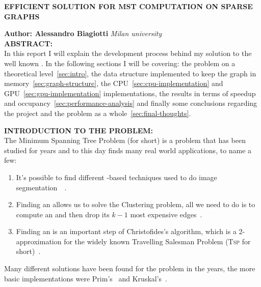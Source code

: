 \documentclass[a4paper,10pt]{article}
\begin{document}
\noindent
\begin{center}
	\textbf{{EFFICIENT SOLUTION FOR MST COMPUTATION ON SPARSE GRAPHS}} \\
\end{center}

\noindent
\textbf{Author: Alessandro Biagiotti} \hfill \textit{Milan university}
\\

\noindent
\textbf{ABSTRACT:}
\\
In this report I will explain the development process behind my solution to the well known \mstp. In the following sections I will be covering: the problem on a theoretical level~\ref{sec:intro}, the data structure implemented to keep the graph in memory~\ref{sec:graph-structure}, the CPU~\ref{sec:cpu-implementation} and GPU~\ref{sec:gpu-implementation} implementations, the results in terms of speedup and occupancy~\ref{sec:performance-analysis} and finally some conclusions regarding the project and the problem as a whole~\ref{sec:final-thoughts}.

\bigskip

\makeatletter{}\makeatother\label{sec:intro}
\noindent
\textbf{INTRODUCTION TO THE PROBLEM:}
\\
The Minimum Spanning Tree Problem (\mstp for short) is a problem that has been studied for years and to this day finds many real world applications, to name a few:
\begin{enumerate}
	\item It's possible to find different \mst-based techniques used to do image segmentation~\cite{maze-generation}~\cite{mst-segmentation-heuristic}.
	\item Finding an \mst allows us to solve the Clustering problem, all we need to do is to compute an \mst and then drop its $k - 1$ most expensive edges~\cite{mst-applications}.
	\item Finding an \mst is an important step of Christofides's algorithm, which is a 2-approximation for the widely known Travelling Salesman Problem (\textsc{Tsp} for short)~\cite{tsp-christofides}.
\end{enumerate}

Many different solutions have been found for the problem in the years, the more basic implementations were Prim's~\cite{prim-algorithm} and Kruskal's~\cite{kruskal-algorithm}.
\end{document}
